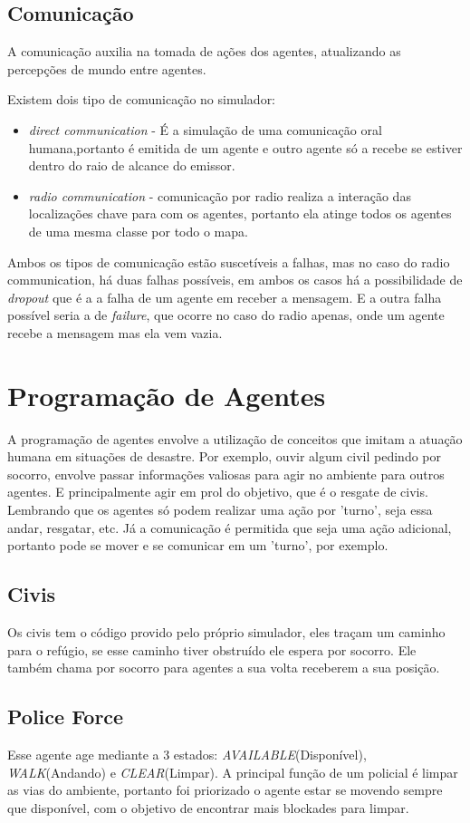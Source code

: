 \documentclass[conference]{IEEEtran}
\begin{document}
\subsection{Comunicação}
A comunicação auxilia na tomada de ações dos agentes, atualizando as percepções de mundo entre agentes.

Existem dois tipo de comunicação no simulador:
\begin{itemize}
\item \textit {direct communication} - É a simulação de uma comunicação oral humana,portanto é emitida de um agente e outro agente só a recebe se estiver dentro do raio de alcance do emissor.
\item \textit {radio communication} - comunicação por radio realiza a interação das localizações chave para com os agentes, portanto ela atinge todos os agentes de uma mesma classe por todo o mapa.
\end{itemize}

Ambos os tipos de comunicação estão suscetíveis a falhas, mas no caso do radio communication, há duas falhas possíveis, em ambos os casos há a possibilidade de \textit{dropout} que é a a falha de um agente em receber a mensagem. E a outra falha possível seria a de \textit{failure}, que ocorre no caso do radio apenas, onde um agente recebe a mensagem mas ela vem vazia.

\section{Programação de Agentes}
A programação de agentes envolve a utilização de conceitos que imitam a atuação humana em situações de desastre. Por exemplo, ouvir algum civil pedindo por socorro, envolve passar informações valiosas para agir no ambiente para outros agentes. E principalmente agir em prol do objetivo, que é o resgate de civis.
Lembrando que os agentes só podem realizar uma ação por 'turno', seja essa andar, resgatar, etc. Já a comunicação é permitida que seja uma ação adicional, portanto pode se mover e se comunicar em um 'turno', por exemplo.
\subsection{Civis}
Os civis tem o código provido pelo próprio simulador, eles traçam um caminho para o refúgio, se esse caminho tiver obstruído ele espera por socorro. Ele também chama por socorro para agentes a sua volta receberem a sua posição.
\subsection{Police Force}
Esse agente age mediante a 3 estados: \textit{AVAILABLE}(Disponível), \textit{WALK}(Andando) e \textit{CLEAR}(Limpar). A principal função de um policial é limpar as vias do ambiente, portanto foi priorizado o agente estar se movendo sempre que disponível, com o objetivo de encontrar mais blockades para limpar.
\end{document}
